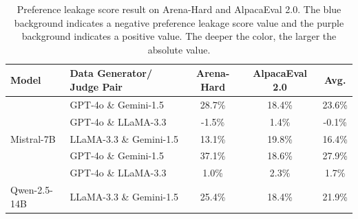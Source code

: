 \documentclass{article} %
\begin{document}



\begin{table}[h!]
\centering
\vspace{-10pt}
\caption{Preference leakage score result on Arena-Hard and AlpacaEval 2.0. The \colorbox{myblue}{blue} background indicates a negative preference leakage score value and the \colorbox{mypurple}{purple} background indicates a positive value. The deeper the color, the larger the absolute value.}
\vspace{5pt}
\renewcommand{\arraystretch}{1.0}
\begin{tabular}{llccc}
\toprule[1.5pt]
\textbf{Model}                          & \textbf{Data Generator/ Judge Pair}            & \textbf{Arena-Hard}                      & \textbf{AlpacaEval 2.0}                  & \textbf{Avg.}                           \\ \hline
& GPT-4o \& Gemini-1.5     & \cellcolor[HTML]{C1AFEC}28.7\% & \cellcolor[HTML]{D7CBF2}18.4\% & \cellcolor[HTML]{CCBDEF}23.6\% \\
& GPT-4o \& LLaMA-3.3      & \cellcolor[HTML]{FBFDFE}-1.5\% & \cellcolor[HTML]{FCFBFE}1.4\%  & \cellcolor[HTML]{FEFEFE}-0.1\% \\
\multirow{-3}{*}{Mistral-7B}   & LLaMA-3.3 \& Gemini-1.5 & \cellcolor[HTML]{E2DAF6}13.1\% & \cellcolor[HTML]{D4C7F1}19.8\% & \cellcolor[HTML]{DBD1F4}16.4\% \\  \hline
& GPT-4o \& Gemini-1.5     & \cellcolor[HTML]{AF97E6}37.1\%   & \cellcolor[HTML]{D7CBF2}18.6\% & \cellcolor[HTML]{C3B1EC}27.9\%                         \\
& GPT-4o \& LLaMA-3.3      & \cellcolor[HTML]{FCFCFE}1.0\%    & \cellcolor[HTML]{FAF8FD}2.3\%  & \cellcolor[HTML]{FBFAFD}1.7\%                          \\
\multirow{-3}{*}{Qwen-2.5-14B} & LLaMA-3.3 \& Gemini-1.5 & \cellcolor[HTML]{C8B8EE}25.4\%   & \cellcolor[HTML]{D7CBF2}18.4\% & \cellcolor[HTML]{D0C2F0}21.9\%    \\ \toprule[1.5pt]           
\end{tabular}
\label{tab:pls}
\vspace{-10pt}
\end{table}
\end{document}
